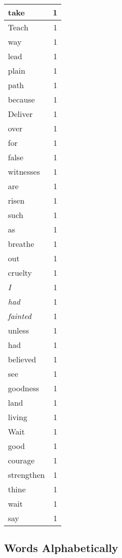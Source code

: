 \begin{center}
\begin{longtable}{l|r}
take & 1 \\ \hline
Teach & 1 \\ \hline
way & 1 \\ \hline
lead & 1 \\ \hline
plain & 1 \\ \hline
path & 1 \\ \hline
because & 1 \\ \hline
Deliver & 1 \\ \hline
over & 1 \\ \hline
for & 1 \\ \hline
false & 1 \\ \hline
witnesses & 1 \\ \hline
are & 1 \\ \hline
risen & 1 \\ \hline
such & 1 \\ \hline
as & 1 \\ \hline
breathe & 1 \\ \hline
out & 1 \\ \hline
cruelty & 1 \\ \hline
\emph{I} & 1 \\ \hline
\emph{had} & 1 \\ \hline
\emph{fainted} & 1 \\ \hline
unless & 1 \\ \hline
had & 1 \\ \hline
believed & 1 \\ \hline
see & 1 \\ \hline
goodness & 1 \\ \hline
land & 1 \\ \hline
living & 1 \\ \hline
Wait & 1 \\ \hline
good & 1 \\ \hline
courage & 1 \\ \hline
strengthen & 1 \\ \hline
thine & 1 \\ \hline
wait & 1 \\ \hline
say & 1 \\ \hline
\end{longtable}
\end{center}



\normalsize



\subsection{Words Alphabetically}

